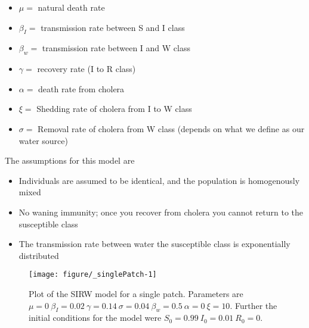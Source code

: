 \documentclass[12pt]{article}\usepackage[]{graphicx}\usepackage[]{color}
\makeatletter
\def\maxwidth{ %
  \ifdim\Gin@nat@width>\linewidth
    \linewidth
  \else
    \Gin@nat@width
  \fi
}
\newenvironment{kframe}{%
 \def\at@end@of@kframe{}%
 \ifinner\ifhmode%
  \def\at@end@of@kframe{\end{minipage}}%
  \begin{minipage}{\columnwidth}%
 \fi\fi%
 \def\FrameCommand##1{\hskip\@totalleftmargin \hskip-\fboxsep
 \colorbox{shadecolor}{##1}\hskip-\fboxsep
     \hskip-\linewidth \hskip-\@totalleftmargin \hskip\columnwidth}%
 \MakeFramed {\advance\hsize-\width
   \@totalleftmargin\z@ \linewidth\hsize
   \@setminipage}}%
 {\par\unskip\endMakeFramed%
 \at@end@of@kframe}
\newenvironment{knitrout}{}{} %
\makeatother
\begin{document}
\begin{itemize}
    \item$\mu=$ natural death rate
    \item$\beta_I=$ transmission rate between S and I class
    \item$\beta_w=$ transmission rate between I and W class
    \item$\gamma=$ recovery rate (I to R class)
    \item$\alpha=$ death rate from cholera
    \item$\xi=$ Shedding rate of cholera from I to W class
    \item$\sigma=$	Removal rate of cholera from W class (depends on what we define as our water source)
\end{itemize}
The assumptions for this model are
\begin{itemize}
    \item Individuals are assumed to be identical, and the population is homogenously mixed
    \item No waning immunity; once you recover from cholera you cannot return to the susceptible class
    \item The transmission rate between water the susceptible class  is exponentially distributed
\end{itemize}

\begin{knitrout}
\color{fgcolor}\begin{kframe}


{\ttfamily\noindent\itshape\color{messagecolor}{\#\# Loading required package: rootSolve}}

{\ttfamily\noindent\itshape\color{messagecolor}{\#\# Loading required package: shape}}

{\ttfamily\noindent\itshape\color{messagecolor}{\#\# Loading required package: testthat}}

{\ttfamily\noindent\itshape\color{messagecolor}{\#\# Loading required package: gsw}}\end{kframe}\begin{figure}[h]
\texttt{[image: figure/\_singlePatch-1]} \caption{\label{fig:singlepatch} Plot of the SIRW model for a single patch. Parameters are $\mu=0\ \beta_I=0.02\ \gamma=0.14\ \sigma=0.04\ \beta_w=0.5\ \alpha=0\ \xi=10$. Further the initial conditions for the model were $S_0=0.99\ I_0=0.01\ R_0=0$.}\label{fig:<singlePatch}
\end{figure}


\end{knitrout}
\FloatBarrier
\end{document}
